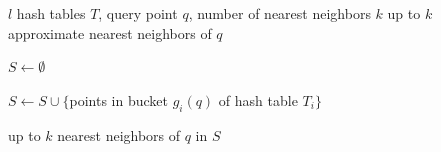 \begin{algorithm}[H]
    \caption{K-NN-SEARCH \cite{Gionis-Indyk-Motwani-1999}}
    \label{alg:lsh-2}
    \begin{algorithmic}[1]
        \Require $l$ hash tables $T$, query point $q$, number of nearest neighbors $k$
        \Ensure up to $k$ approximate nearest neighbors of $q$
        
        \State $S \gets \emptyset$ 
        
            \State $S \gets S \cup \{$points in bucket $g_i(q)$ of hash table $T_i\}$
        \EndFor
        
        \State \Return up to $k$ nearest neighbors of $q$ in $S$
    \end{algorithmic}
\end{algorithm}